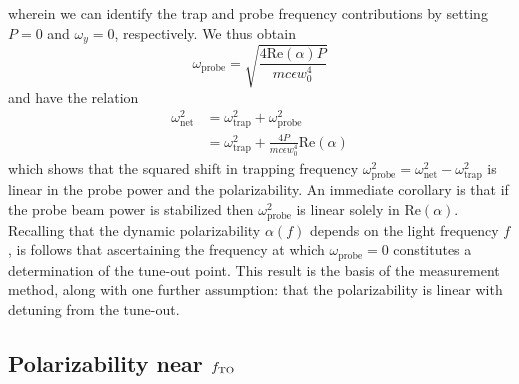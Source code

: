 	wherein we can identify the trap and probe frequency contributions by setting $P=0$ and $\omega_y=0$, respectively. 
	We thus obtain 
	\begin{equation}
		\omega_\mathrm{probe} = \sqrt{\frac{4 \mathrm{Re}(\alpha)  P}{m c \epsilon w_{0}^4}}
	\end{equation}
	and have the relation
	\begin{align}
		\omega_\mathrm{net}^2 &= \omega_\mathrm{trap}^2 + \omega_\mathrm{probe}^2\\
		&= \omega_\mathrm{trap}^2 + \frac{4   P}{m c \epsilon w_{0}^4}\mathrm{Re}(\alpha)
	\end{align}
	which shows that the squared shift in trapping frequency $\omega_\mathrm{probe}^2 = \omega_\mathrm{net}^2 - \omega_\mathrm{trap}^2$ is linear in the probe power and the polarizability. 
	An immediate corollary is that if the probe beam power is stabilized then $\omega_\mathrm{probe}^2$	is linear solely in $\mathrm{Re}(\alpha)$. Recalling that the dynamic polarizability $\alpha(f)$ depends on the light frequency $f$, is follows that ascertaining the frequency at which $\omega_\mathrm{probe}=0$ constitutes a determination of the tune-out point.
	This result is the basis of the measurement method, along with one further assumption: that the polarizability is linear with detuning from the tune-out.

\subsection{Polarizability near $f_\mathrm{TO}$}


